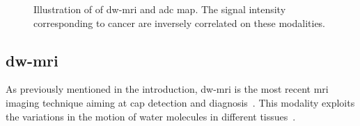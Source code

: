 \begin{figure}
  \centering
  \hspace*{\fill}
  \hfill
  \hspace*{\fill}
  \caption[Example of \acs*{dw}-\acs*{mri} and \acs*{dce} map.]{Illustration of
    of \acs*{dw}-\acs*{mri} and \acs*{adc} map. The signal intensity
    corresponding to cancer are inversely correlated on these modalities.}
  \label{fig:dwi}
\end{figure}

\subsection{\acs*{dw}-\acs*{mri}}\label{subsec:chp2:imaging:dw}
As previously mentioned in the introduction, \ac{dw}-\ac{mri} is the most
recent \ac{mri} imaging technique aiming at \ac{cap} detection and
diagnosis~\cite{Scheidler1999}.
This modality exploits the variations in the motion of water molecules in
different tissues~\cite{LeBihan1988,Koh2007}.

